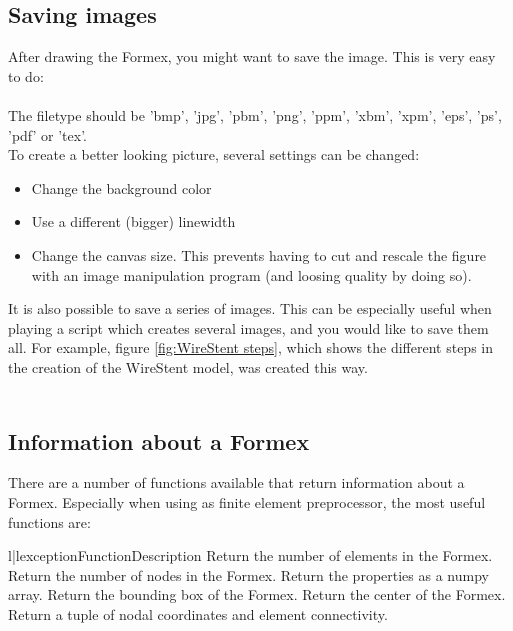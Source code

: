 {\subsection{Saving images}
\label{subsec:images}
After drawing the Formex, you might want to save the image. This is very easy to do:\\
\\
The filetype should be 'bmp', 'jpg', 'pbm', 'png', 'ppm', 'xbm', 'xpm', 'eps', 'ps', 'pdf' or 'tex'. \\
To create a better looking picture, several settings can be changed:
\begin{itemize}
	\item Change the background color 
	\item Use a different (bigger) linewidth 
	\item Change the canvas size. This prevents having to cut and rescale the figure with an image manipulation program (and loosing quality by doing so).  
\end{itemize}

It is also possible to save a series of images. This can be especially useful when playing a script which creates several images, and you would like to save them all.  For example, figure \ref{fig:WireStent steps}, which shows the different steps in the creation of the WireStent model, was created this way.\\
\\


\subsection{Information about a Formex}
\label{subsec:info}
There are a number of functions available that return information about a Formex. Especially when using \pyformex as finite element preprocessor, the most useful functions are:
\begin{tableii}{l|l}{exception}{Function}{Description}
		{Return the number of elements in the Formex.}
		{Return the number of nodes in the Formex.}
		{Return the properties as a numpy array.}
		{Return the bounding box of the Formex.}
		{Return the center of the Formex.}
		{Return a tuple of nodal coordinates and element connectivity.}
\end{tableii}

}
